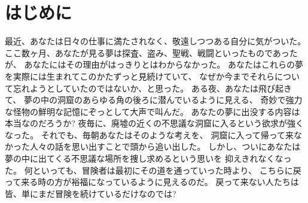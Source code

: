 \maketitle

\section{はじめに}


最近、あなたは日々の仕事に満たされなく、敬遠しつつある自分に気がついた。
ここ数ヶ月、あなたが見る夢は探査、盗み、聖戦、戦闘といったものであったが、
あなたにはその理由がはっきりとはわからなかった。
あなたはこれらの夢を実際には生まれてこのかたずっと見続けていて、
なぜか今までそれらについて忘れようとしていたのではないか、と思った。
ある夜、あなたは飛び起きて、
夢の中の洞窟のあらゆる角の後ろに潜んでいるように見える、
奇妙で強力な怪物の鮮明な記憶にぞっとして大声で叫んだ。
あなたの夢に出没する内容は本当なのだろうか?
夜毎に、廃墟の近くの不思議な洞窟に入るという欲求が強くなった。
それでも、毎朝あなたはそのような考えを、
洞窟に入って帰って来なかった人々の話を思い出すことで頭から追い出した。
しかし、ついにあなたは夢の中に出てくる不思議な場所を捜し求めるという思いを
抑えきれなくなった。
何といっても、冒険者は最初にその道を通っていった時より、
こちらに戻って来る時の方が裕福になっているように見えるのだ。
戻って来ない人たちは皆、単にまだ冒険を続けているだけなのでは?

